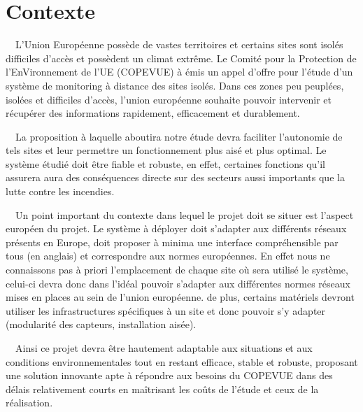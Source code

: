 \documentclass{mise_en_page}
\begin{document}
\maketitle

\begin{historique}
\end{historique}

\newpage

\tableofcontents

\section{Contexte}
\ \ L’Union Européenne possède de vastes territoires et certains sites
sont isolés difficiles d’accès et possèdent un climat extrême. Le
Comité pour la Protection de l’EnVironnement de l’UE (COPEVUE) à émis
un appel d’offre pour l’étude d’un système de monitoring à distance des
sites isolés. Dans ces zones peu peuplées, isolées et difficiles
d’accès, l’union européenne souhaite pouvoir intervenir et récupérer
des informations rapidement, efficacement et durablement.

\ \ La proposition à laquelle aboutira notre étude devra faciliter
l’autonomie de tels sites et leur permettre un fonctionnement plus aisé
et plus optimal. Le système étudié doit être fiable et robuste, en
effet, certaines fonctions qu’il assurera aura des conséquences directe
sur des secteurs aussi importants que la lutte contre les incendies.

\ \ Un point important du contexte dans lequel le projet doit se situer
est l’aspect européen du projet. Le système à déployer doit s’adapter
aux différents réseaux présents en Europe, doit proposer à minima une
interface compréhensible par tous (en anglais)  et correspondre aux
normes européennes. En effet nous ne connaissons pas à priori
l’emplacement de chaque site où sera utilisé le système, celui-ci devra
donc dans l’idéal pouvoir s’adapter aux différentes normes réseaux
mises en places au sein de l’union européenne. de plus, certains
matériels devront utiliser les infrastructures spécifiques à un site et
donc pouvoir s’y adapter (modularité des capteurs, installation aisée).

\ \ Ainsi ce projet devra être hautement adaptable aux situations et aux
conditions environnementales tout en restant efficace, stable et
robuste, proposant une solution innovante apte à répondre aux besoins
du COPEVUE dans des délais relativement courts en maîtrisant les coûts
de l’étude et ceux de la réalisation.
\end{document}
